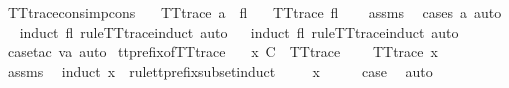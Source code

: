 \endisatagproof
{\isafoldproof}%
%
\isadelimproof
\isanewline
%
\endisadelimproof
\isanewline
{}\isamarkupfalse%
\ TT{}{\isacharunderscore}trace{\isacharunderscore}cons{\isacharunderscore}imp{\isacharunderscore}cons{\isacharcolon}\isanewline
\ \ \ {\isachardoublequoteopen}TT{}{\isacharunderscore}trace\ {\isacharparenleft}a\ {\isacharhash}\ fl{\isacharparenright}{\isachardoublequoteclose}\isanewline
\ \ \ {\isachardoublequoteopen}TT{}{\isacharunderscore}trace\ fl{\isachardoublequoteclose}\isanewline
%
\isadelimproof
\ \ %
\endisadelimproof
%
\isatagproof
{}\isamarkupfalse%
\ assms\ \isamarkupfalse%
\ {\isacharparenleft}cases\ a{\isacharcomma}\ auto{\isacharparenright}\isanewline
\ \ \isamarkupfalse%
{\isacharparenleft}induct\ fl\ rule{\isacharcolon}TT{}{\isacharunderscore}trace{\isachardot}induct{\isacharcomma}\ auto{\isacharparenright}\isanewline
\ \ \isamarkupfalse%
{\isacharparenleft}induct\ fl\ rule{\isacharcolon}TT{}{\isacharunderscore}trace{\isachardot}induct{\isacharcomma}\ auto{\isacharparenright}\isanewline
\ \ \isamarkupfalse%
\ {\isacharparenleft}case{\isacharunderscore}tac\ va{\isacharcomma}\ auto{\isacharparenright}%
\endisatagproof
{\isafoldproof}%
%
\isadelimproof
\isanewline
%
\endisadelimproof
\isanewline
{}\isamarkupfalse%
\ tt{\isacharunderscore}prefix{\isacharunderscore}of{\isacharunderscore}TT{}{\isacharunderscore}trace{\isacharcolon}\isanewline
\ \ \ {\isachardoublequoteopen}x\ {\isasymlesssim}\isactrlsub C\ {\isasymsigma}{\isachardoublequoteclose}\ {\isachardoublequoteopen}TT{}{\isacharunderscore}trace\ {\isasymsigma}{\isachardoublequoteclose}\isanewline
\ \ \ {\isachardoublequoteopen}TT{}{\isacharunderscore}trace\ x{\isachardoublequoteclose}\isanewline
%
\isadelimproof
\ \ %
\endisadelimproof
%
\isatagproof
{}\isamarkupfalse%
\ assms\ \isanewline
{}\isamarkupfalse%
\ {\isacharparenleft}induct\ x\ {\isasymsigma}\ rule{\isacharcolon}tt{\isacharunderscore}prefix{\isacharunderscore}subset{\isachardot}induct{\isacharparenright}\isanewline
\ \ \isamarkupfalse%
\ {\isacharparenleft}{}\ x{\isacharparenright}\isanewline
\ \ \isamarkupfalse%
\ \isamarkupfalse%
\ {\isacharquery}case\ \isamarkupfalse%
\ auto\isanewline
{}\isamarkupfalse%
